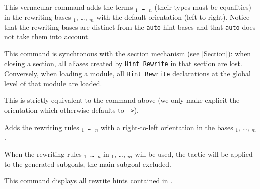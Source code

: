 \subsection{}
\label{HintRewrite}

This vernacular command adds the terms {\tt \term$_1$ \mbox{\dots} \term$_n$}
(their types must be equalities) in the rewriting bases \ident$_1$, \dots, \ident$_m$
with the default orientation (left to right). Notice that the
rewriting bases are distinct from the {\tt auto} hint bases and that
{\tt auto} does not take them into account.

This command is synchronous with the section mechanism (see \ref{Section}):
when closing a section, all aliases created by \texttt{Hint Rewrite} in that
section are lost. Conversely, when loading a module, all \texttt{Hint Rewrite}
declarations at the global level of that module are loaded.

\begin{Variants}
\item {}

This is strictly equivalent to the command above (we only make explicit the
orientation which otherwise defaults to {\tt ->}).

\item {}

Adds the rewriting rules {\tt \term$_1$ \mbox{\dots} \term$_n$} with a right-to-left
orientation in the bases \ident$_1$, \dots, \ident$_m$.

\item {}

When the rewriting rules {\tt \term$_1$ \mbox{\dots} \term$_n$} in \ident$_1$, \dots, \ident$_m$ will
be used, the tactic {\tt \tac} will be applied to the generated subgoals, the
main subgoal excluded.


\item {}

  This command displays all rewrite hints contained in {\ident}.

\end{Variants}

